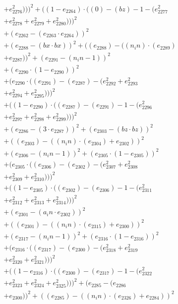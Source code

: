 \documentclass[10pt, a4paper]{article}
\begin{document}
\begin{small}
\begin{align*}
& + e_{2276}^{2})))^{2} + ((1 - e_{2264})  \cdot  ((0) - (bz) - 1 - (e_{2277}^{2} \\
& + e_{2278}^{2} + e_{2279}^{2} + e_{2280}^{2})))^{2} \\
& + (e_{2262} - (e_{2263}  \cdot  e_{2264}))^{2} \\
& + (e_{2288} - (bx  \cdot  bx))^{2} + ((e_{2288}) - ((n_in)  \cdot  (e_{2289}) \\
& + e_{2287}))^{2} + (e_{2291} - (n_in - 1))^{2} \\
& + (e_{2290}  \cdot  (1 - e_{2290}))^{2} \\
& + (e_{2290}  \cdot  ((e_{2291}) - (e_{2287}) - (e_{2292}^{2} + e_{2293}^{2} \\
& + e_{2294}^{2} + e_{2295}^{2})))^{2} \\
& + ((1 - e_{2290})  \cdot  ((e_{2287}) - (e_{2291}) - 1 - (e_{2296}^{2} \\
& + e_{2297}^{2} + e_{2298}^{2} + e_{2299}^{2})))^{2} \\
& + (e_{2286} - (3  \cdot  e_{2287}))^{2} + (e_{2303} - (bz  \cdot  bz))^{2} \\
& + ((e_{2303}) - ((n_in)  \cdot  (e_{2304}) + e_{2302}))^{2} \\
& + (e_{2306} - (n_in - 1))^{2} + (e_{2305}  \cdot  (1 - e_{2305}))^{2} \\
& + (e_{2305}  \cdot  ((e_{2306}) - (e_{2302}) - (e_{2307}^{2} + e_{2308}^{2} \\
& + e_{2309}^{2} + e_{2310}^{2})))^{2} \\
& + ((1 - e_{2305})  \cdot  ((e_{2302}) - (e_{2306}) - 1 - (e_{2311}^{2} \\
& + e_{2312}^{2} + e_{2313}^{2} + e_{2314}^{2})))^{2} \\
& + (e_{2301} - (a_in  \cdot  e_{2302}))^{2} \\
& + ((e_{2301}) - ((n_in)  \cdot  (e_{2315}) + e_{2300}))^{2} \\
& + (e_{2317} - (n_in - 1))^{2} + (e_{2316}  \cdot  (1 - e_{2316}))^{2} \\
& + (e_{2316}  \cdot  ((e_{2317}) - (e_{2300}) - (e_{2318}^{2} + e_{2319}^{2} \\
& + e_{2320}^{2} + e_{2321}^{2})))^{2} \\
& + ((1 - e_{2316})  \cdot  ((e_{2300}) - (e_{2317}) - 1 - (e_{2322}^{2} \\
& + e_{2323}^{2} + e_{2324}^{2} + e_{2325}^{2})))^{2} + (e_{2285} - (e_{2286} \\
& + e_{2300}))^{2} + ((e_{2285}) - ((n_in)  \cdot  (e_{2326}) + e_{2284}))^{2} \\

\end{align*}
\end{small}
\end{document}
